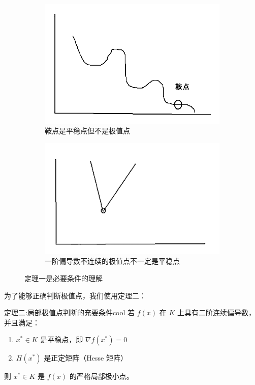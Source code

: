 \begin{figure}[H]
    \centering
    \begin{subfigure}{0.42\textwidth}
        \centering
        \includegraphics[width=\linewidth]{image/20.png}
        \caption{鞍点是平稳点但不是极值点}
    \end{subfigure}
    \hfill
    \begin{subfigure}{0.4\textwidth}
        \centering
        \includegraphics[width=\linewidth]{image/21.png}
        \caption{一阶偏导数不连续的极值点不一定是平稳点}
    \end{subfigure}
    \caption{定理一是必要条件的理解}
\end{figure}
为了能够正确判断极值点，我们使用定理二：
\begin{thmbox}{定理二:局部极值点判断的充要条件}{cool}
    若 $f(x)$ 在 $K$ 上具有二阶连续偏导数，并且满足：
    \begin{enumerate}
        \item $x^* \in K$ 是平稳点，即 $\nabla f(x^*) = 0$
        \item $H(x^*)$ 是正定矩阵（Hesse 矩阵）
    \end{enumerate}
    则 $x^* \in K$ 是 $f(x)$ 的严格局部极小点。
\end{thmbox}

